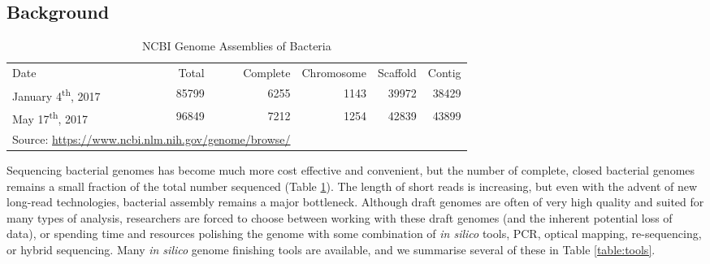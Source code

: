 \documentclass[10pt]{article}
\makeatletter
\newcommand{\ra}[1]{\renewcommand{\arraystretch}{#1}}
\newcommand{\cmidrules}[1]{%
  \noalign{%
    \global\MD@cmidrules={}%
    \toks@={\cmidrule(l{.3\tabcolsep}r{.3\tabcolsep})}%
    \count@=\z@
    \loop\ifnum\count@<#1\relax
      \advance\count@\@ne
      \edef\MD@temp{\the\toks@{\the\count@-\the\count@}}%
      \global\MD@cmidrules\expandafter{\the\expandafter\MD@cmidrules\MD@temp}%
    \repeat
  }%
  \the\MD@cmidrules
}
\makeatother
\begin{document}
\begin{linenumbers}


\section*{Background}

\begin{table}[!b]
  \centering
  \ra{1.3}
  \caption{NCBI Genome Assemblies of Bacteria}
  \label{table:completions}
  \begin{tabular}{lrrrrr}
    \toprule
    Date & Total & Complete & Chromosome & Scaffold & Contig \\
    \cmidrules{6}
    January 4\textsuperscript{th}, 2017 & 85799 & 6255 & 1143 & 39972 & 38429  \\
    May 17\textsuperscript{th}, 2017 & 96849 & 7212 & 1254 & 42839 & 43899\\
    \bottomrule
    \multicolumn{3}{l}{\tiny Source: \url{https://www.ncbi.nlm.nih.gov/genome/browse/}}
  \end{tabular}
\end{table}

Sequencing bacterial genomes has become much more cost effective and convenient, but the number of complete, closed bacterial genomes remains a small fraction of the total number sequenced (Table \ref{table:completions}). The length of short reads is increasing, but even with the advent of new long-read technologies, bacterial assembly remains a major bottleneck\cite{Nagarajan2010,Brouwer2016}. Although draft genomes are often of very high quality and suited for many types of analysis, researchers are forced to choose between working with these draft genomes (and the inherent potential loss of data), or spending time and resources polishing the genome with some combination of \textit{in silico} tools, PCR, optical mapping, re-sequencing, or hybrid sequencing\cite{Nagarajan2010,Utturkar2014}. Many \textit{in silico} genome finishing tools are available, and we summarise several of these in Table \ref{table:tools}.



\end{linenumbers}
\end{document}
